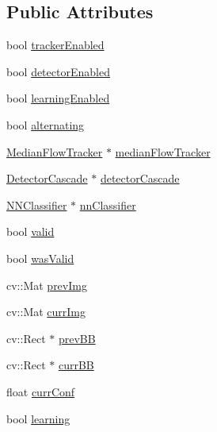 \subsection*{Public Attributes}
\begin{DoxyCompactItemize}
\item 
bool \hyperlink{classtld_1_1_t_l_d_ab94fab1f55f6ef122c9e3fcf4747ac50}{trackerEnabled}
\item 
bool \hyperlink{classtld_1_1_t_l_d_a925a0be8c0b83bcb8c2c91a046c7db1b}{detectorEnabled}
\item 
bool \hyperlink{classtld_1_1_t_l_d_a86422799478881dd711d0a78444be245}{learningEnabled}
\item 
bool \hyperlink{classtld_1_1_t_l_d_a873bb61492173098b134d94239ef0ba4}{alternating}
\item 
\hyperlink{classtld_1_1_median_flow_tracker}{MedianFlowTracker} $\ast$ \hyperlink{classtld_1_1_t_l_d_a8b523afaefa5fbd9bc86fd656b87e1c0}{medianFlowTracker}
\item 
\hyperlink{classtld_1_1_detector_cascade}{DetectorCascade} $\ast$ \hyperlink{classtld_1_1_t_l_d_abe59bf99d46b55f6ef402cb48f9d290b}{detectorCascade}
\item 
\hyperlink{classtld_1_1_n_n_classifier}{NNClassifier} $\ast$ \hyperlink{classtld_1_1_t_l_d_a98a1be08a4b630d85e5e60dc4bb78b13}{nnClassifier}
\item 
bool \hyperlink{classtld_1_1_t_l_d_a2a238338a62dac450b2759f99d5ae304}{valid}
\item 
bool \hyperlink{classtld_1_1_t_l_d_a26e0c624178eb37a57cd0146efa6d262}{wasValid}
\item 
cv::Mat \hyperlink{classtld_1_1_t_l_d_a7b402ff7a0260f00b8d3dbcea5c87efa}{prevImg}
\item 
cv::Mat \hyperlink{classtld_1_1_t_l_d_a7bb2c3271567719afb2f97e5953c31d5}{currImg}
\item 
cv::Rect $\ast$ \hyperlink{classtld_1_1_t_l_d_adc7a217f04d600daffe8d025f424677f}{prevBB}
\item 
cv::Rect $\ast$ \hyperlink{classtld_1_1_t_l_d_a5af4bc9d8fa64c4423b294f727c4ba55}{currBB}
\item 
float \hyperlink{classtld_1_1_t_l_d_ab2e815db72cb2f40a7864c4d4457eb34}{currConf}
\item 
bool \hyperlink{classtld_1_1_t_l_d_a0f108af012bc9b7d004bed33cf8e4d90}{learning}
\end{DoxyCompactItemize}


